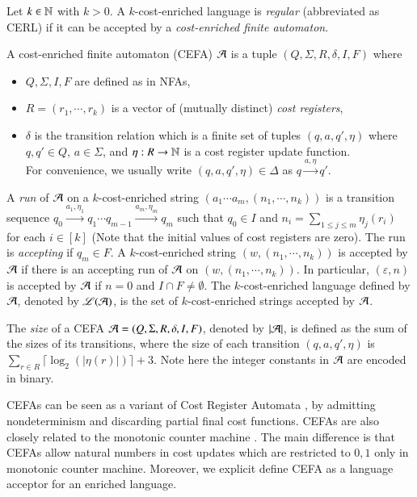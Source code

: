 \begin{definition}
Let $k \in \mathbb{N}$ with $k > 0$. A $k$-cost-enriched language is \emph{regular} (abbreviated as CERL) if it can be accepted by a \emph{cost-enriched finite automaton}. 

A cost-enriched finite automaton (CEFA) $\mathcal{A}$ is a tuple $(Q, \Sigma, R, \delta, I, F)$ where 
\begin{itemize}
\item $Q, \Sigma, I, F$ are defined as in NFAs, 
%
\item $R=(r_1, \cdots, r_k)$ is a vector of (mutually distinct) \emph{cost registers}, 
%
\item $\delta$ is the transition relation which is a finite set of tuples $(q, a, q', \eta)$ where $q, q' \in Q$, $a \in \Sigma$, and %
$\eta: R \rightarrow \mathbb{N}$
is a cost register update function. \\
For convenience, we usually write $(q, a, q', \eta) \in \Delta$ as $q \xrightarrow{a, \eta} q'$.
\end{itemize}
%
A \emph{run} of $\mathcal{A}$ on a $k$-cost-enriched string $(a_1 \cdots a_m, (n_1, \cdots,n_k))$ is a  transition sequence $q_0 \xrightarrow{a_1, \eta_1} q_1 \cdots q_{m-1} \xrightarrow{a_m, \eta_m} q_m$ such that $q_0 \in I$ and $n_i = \sum \limits_{1\leq j\leq m}\eta_j(r_i)$ for each $i \in [k]$ (Note that the initial values of cost registers are zero). The run is \emph{accepting} if $q_m \in F$. A $k$-cost-enriched string $(w, (n_1, \cdots,n_k))$ is accepted by $\mathcal{A}$ if there is an accepting run of $\mathcal{A}$ on $(w, (n_1, \cdots,n_k))$. In particular, $(\varepsilon, n)$ is accepted by $\mathcal{A}$ if $n=0$ and $I\cap F \neq \emptyset$.
The $k$-cost-enriched language defined by $\mathcal{A}$, denoted by $\mathscr{L}(\mathcal{A})$, is the set of $k$-cost-enriched strings accepted by $\mathcal{A}$. 
\end{definition}
The \emph{size} of a CEFA $\mathcal{A}=(Q, \Sigma, R, \delta, I, F)$, denoted by $|\mathcal{A}|$, is defined as the sum of the sizes of its transitions, where the size of each transition $(q, a, q', \eta)$ is $\sum \limits_{r \in R} \lceil \log_2 (|\eta(r)|) \rceil +3$. Note here  the integer constants in $\mathcal{A}$ are encoded in binary.

\begin{remark}
CEFAs can be seen as a variant of Cost Register Automata \cite{RLJ+13}, by admitting nondeterminism and discarding partial final cost functions. CEFAs are also closely related to the monotonic counter machine \cite{LB16}. The main difference is that CEFAs allow natural numbers in cost updates which are restricted to $0,1$ only in monotonic counter machine. Moreover, we explicit define CEFA as a language acceptor for an enriched language.
\end{remark}

